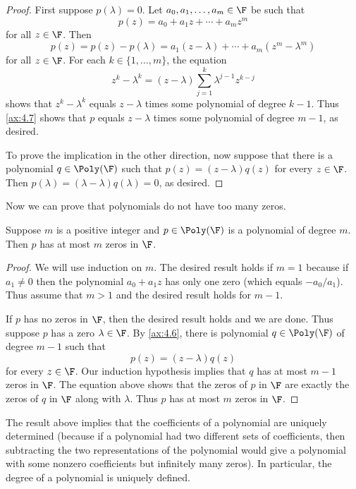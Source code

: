 \begin{proof}
First suppose $p(\lambda)=0$. Let $a_0,a_1,\dots,a_m\in\F$ be such that
\[ p(z) = a_0+a_1z+\cdots+a_mz^m \]
for all $z\in\F$. Then
\begin{equation*}
p(z) = p(z)-p(\lambda) = a_1(z-\lambda)+\cdots+a_m(z^m-\lambda^m)
\tag*{\thetheorem}\label{ax:4.7}
\end{equation*}
for all $z\in\F$. For each $k\in\{1,\dots,m\}$, the equation
\[ z^k-\lambda^k = (z-\lambda)\sum_{j=1}^{k}\lambda^{j-1}z^{k-j} \]
shows that $z^k-\lambda^k$ equals $z-\lambda$ times some polynomial of degree
$k-1$. Thus \ref{ax:4.7} shows that $p$ equals $z-\lambda$ times some
polynomial of degree $m-1$, as desired.

To prove the implication in the other direction, now suppose that there is a
polynomial $q\in\Poly(\F)$ such that $p(z)=(z-\lambda)q(z)$ for every
$z\in\F$. Then $p(\lambda)=(\lambda-\lambda)q(\lambda)=0$, as desired.
\end{proof}

Now we can prove that polynomials do not have too many zeros.

\begin{result}\label{ax:4.8}
Suppose $m$ is a positive integer and $p\in\Poly(\F)$ is a polynomial of degree
$m$. Then $p$ has at most $m$ zeros in $\F$.
\end{result}

\begin{proof}
We will use induction on $m$. The desired result holds if $m=1$ because if
$a_1\ne0$ then the polynomial $a_0+a_1z$ has only one zero (which equals
$-a_0/a_1$). Thus assume that $m>1$ and the desired result holds for $m-1$.

If $p$ has no zeros in $\F$, then the desired result holds and we are done.
Thus suppose $p$ has a zero $\lambda\in\F$. By \ref{ax:4.6}, there is
polynomial $q\in\Poly(\F)$ of degree $m-1$ such that
\[ p(z) = (z-\lambda)q(z) \]
for every $z\in\F$. Our induction hypothesis implies that $q$ has at most $m-1$
zeros in $\F$. The equation above shows that the zeros of $p$ in $\F$ are
exactly the zeros of $q$ in $\F$ along with $\lambda$. Thus $p$ has at most $m$
zeros in $\F$.
\end{proof}

The result above implies that the coefficients of a polynomial are uniquely
determined (because if a polynomial had two different sets of coefficients,
then subtracting the two representations of the polynomial would give a
polynomial with some nonzero coefficients but infinitely many zeros). In
particular, the degree of a polynomial is uniquely defined.

